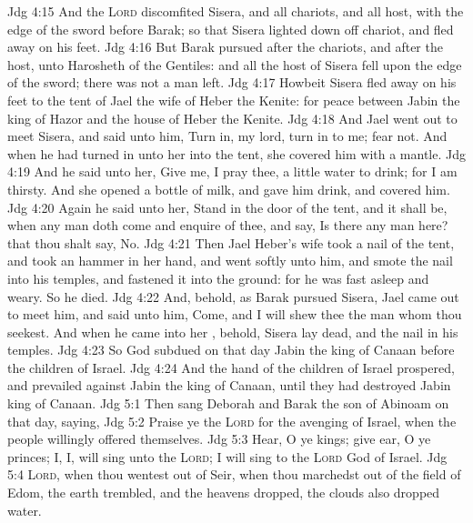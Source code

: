 \vs Jdg 4:15 And the \textsc{Lord} discomfited Sisera, and all  chariots, and all  host, with the edge of the sword before Barak; so that Sisera lighted down off  chariot, and fled away on his feet.
\vs Jdg 4:16 But Barak pursued after the chariots, and after the host, unto Harosheth of the Gentiles: and all the host of Sisera fell upon the edge of the sword;  there was not a man left.
\vs Jdg 4:17 Howbeit Sisera fled away on his feet to the tent of Jael the wife of Heber the Kenite: for  peace between Jabin the king of Hazor and the house of Heber the Kenite.
\vs Jdg 4:18 And Jael went out to meet Sisera, and said unto him, Turn in, my lord, turn in to me; fear not. And when he had turned in unto her into the tent, she covered him with a mantle.
\vs Jdg 4:19 And he said unto her, Give me, I pray thee, a little water to drink; for I am thirsty. And she opened a bottle of milk, and gave him drink, and covered him.
\vs Jdg 4:20 Again he said unto her, Stand in the door of the tent, and it shall be, when any man doth come and enquire of thee, and say, Is there any man here? that thou shalt say, No.
\vs Jdg 4:21 Then Jael Heber's wife took a nail of the tent, and took an hammer in her hand, and went softly unto him, and smote the nail into his temples, and fastened it into the ground: for he was fast asleep and weary. So he died.
\vs Jdg 4:22 And, behold, as Barak pursued Sisera, Jael came out to meet him, and said unto him, Come, and I will shew thee the man whom thou seekest. And when he came into her , behold, Sisera lay dead, and the nail  in his temples.
\vs Jdg 4:23 So God subdued on that day Jabin the king of Canaan before the children of Israel.
\vs Jdg 4:24 And the hand of the children of Israel prospered, and prevailed against Jabin the king of Canaan, until they had destroyed Jabin king of Canaan.
\vs Jdg 5:1 Then sang Deborah and Barak the son of Abinoam on that day, saying,
\vs Jdg 5:2 Praise ye the \textsc{Lord} for the avenging of Israel, when the people willingly offered themselves.
\vs Jdg 5:3 Hear, O ye kings; give ear, O ye princes; I,  I, will sing unto the \textsc{Lord}; I will sing  to the \textsc{Lord} God of Israel.
\vs Jdg 5:4 \textsc{Lord}, when thou wentest out of Seir, when thou marchedst out of the field of Edom, the earth trembled, and the heavens dropped, the clouds also dropped water.
